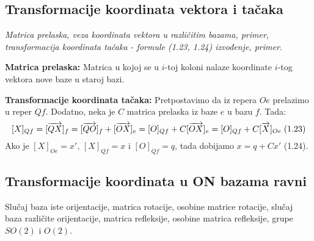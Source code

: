 \documentclass[12pt]{article}
\newcommand{\vek}[1]{\overrightarrow{#1}}
\begin{document}
\subsection{Transformacije koordinata vektora i tačaka}
\textit{Matrica prelaska, veza koordinata vektora u različitim bazama,
    primer, transformacija koordinata tačaka - formule (1.23, 1.24)
    izvođenje, primer.}
\par
\vspace*{1cm}

\textbf{Matrica prelaska:} Matrica u kojoj se u $i$-toj koloni nalaze
koordinate $i$-tog vektora nove baze u staroj bazi.
\par

\textbf{Transformacije koordinata tačaka:} Pretpostavimo da iz repera $Oe$
prelazimo u reper $Qf$. Dodatno, neka je $C$ matrica prelaska iz baze $e$ u
bazu $f$. Tada:
$$[X]_{Qf} =[\vek{QX}]_f =[\vek{QO}]_f+[\vek{OX}]_e =[O]_{Qf}+C[\vek{OX}]_e =[O]_{Qf}+C[\vek{X}]_{Oe} \hspace*{0.1cm}\text{(1.23)}$$
Ako je $[X]_{Oe}=x'$, $[X]_{Qf}=x$ i $[O]_{Qf}=q$, tada dobijamo $x=q+Cx'$ (1.24).
\par

\subsection{Transformacije koordinata u ON bazama ravni}
\label{subsec:pitanje_9}
Slučaj baza iste orijentacije, matrica rotacije, osobine matrice
rotacije, slučaj baza različite orijentacije, matrica refleksije,
osobine matrica refleksije, grupe $SO(2)$ i $O(2)$.\par

\vspace*{1cm}
\end{document}
